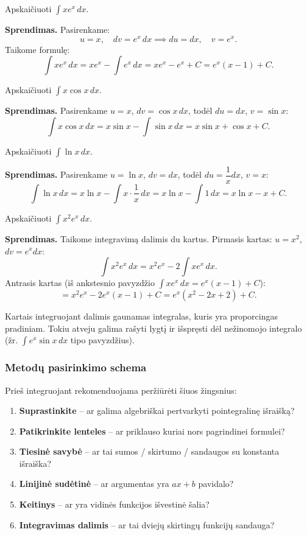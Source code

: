 \begin{example}
Apskaičiuoti $\displaystyle\int x e^x\,dx$.

\textbf{Sprendimas.} Pasirenkame:
\[
u = x, \quad dv = e^x\,dx \implies du = dx, \quad v = e^x.
\]
Taikome formulę:
\[
\int x e^x\,dx = x e^x - \int e^x\,dx = xe^x - e^x + C = e^x(x-1)+C.
\]
\end{example}

\begin{example}
Apskaičiuoti $\displaystyle\int x\cos x\,dx$.

\textbf{Sprendimas.} Pasirenkame $u=x$, $dv=\cos x\,dx$, todėl $du=dx$, $v=\sin x$:
\[
\int x\cos x\,dx = x\sin x - \int \sin x\,dx = x\sin x + \cos x + C.
\]
\end{example}

\begin{example}
Apskaičiuoti $\displaystyle\int \ln x\,dx$.

\textbf{Sprendimas.} Pasirenkame $u=\ln x$, $dv=dx$, todėl $du=\dfrac{1}{x}dx$, $v=x$:
\[
\int \ln x\,dx = x\ln x - \int x\cdot\frac{1}{x}\,dx = x\ln x - \int 1\,dx = x\ln x - x + C.
\]
\end{example}

\begin{example}
Apskaičiuoti $\displaystyle\int x^2 e^x\,dx$.

\textbf{Sprendimas.} Taikome integravimą dalimis du kartus. Pirmasis kartas: $u=x^2$, $dv=e^x dx$:
\[
\int x^2 e^x\,dx = x^2 e^x - 2\int x e^x\,dx.
\]
Antrasis kartas (iš ankstesnio pavyzdžio $\int xe^x\,dx = e^x(x-1)+C$):
\[
= x^2 e^x - 2e^x(x-1)+C = e^x(x^2-2x+2)+C.
\]
\end{example}

\begin{remark}
Kartais integruojant dalimis gaunamas integralas, kuris yra proporcingas pradiniam. Tokiu atveju galima rašyti lygtį ir išspręsti dėl nežinomojo integralo (žr. $\int e^x \sin x\,dx$ tipo pavyzdžius).
\end{remark}

\subsubsection*{Metodų pasirinkimo schema}

Prieš integruojant rekomenduojama peržiūrėti šiuos žingsnius:

\begin{enumerate}[label=\arabic*.]
  \item \textbf{Suprastinkite} – ar galima algebriškai pertvarkyti pointegralinę išraišką?
  \item \textbf{Patikrinkite lenteles} – ar priklauso kuriai nors pagrindinei formulei?
  \item \textbf{Tiesinė savybė} – ar tai sumos / skirtumo / sandaugos su konstanta išraiška?
  \item \textbf{Linijinė sudėtinė} – ar argumentas yra $ax+b$ pavidalo?
  \item \textbf{Keitinys} – ar yra vidinės funkcijos išvestinė šalia?
  \item \textbf{Integravimas dalimis} – ar tai dviejų skirtingų funkcijų sandauga?
\end{enumerate}



